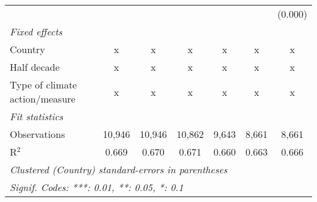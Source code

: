 \begin{tabular}{lcccccc}
                                              &         &               &                &                &                & (0.000)\\   
   \emph{Fixed effects}\\
   Country                                    & x       & x             & x              & x              & x              & x\\  
   Half decade                                & x       & x             & x              & x              & x              & x\\  
   Type of climate action/measure             & x       & x             & x              & x              & x              & x\\  
   \midrule \emph{Fit statistics}\\
   Observations                               & 10,946  & 10,946        & 10,862         & 9,643          & 8,661          & 8,661\\  
   R$^2$                                      & 0.669   & 0.670         & 0.671          & 0.660          & 0.663          & 0.666\\  
   \midrule
   \multicolumn{7}{l}{\emph{Clustered (Country) standard-errors in parentheses}}\\
   \multicolumn{7}{l}{\emph{Signif. Codes: ***: 0.01, **: 0.05, *: 0.1}}\\
\end{tabular}
\par\endgroup


